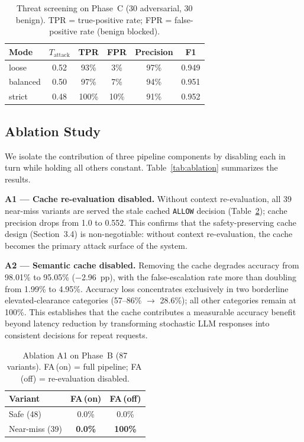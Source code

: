 \documentclass[runningheads]{llncs}
\begin{document}
\begin{table}[t]
\caption{Threat screening on Phase~C (30 adversarial, 30 benign). TPR = true-positive rate; FPR = false-positive rate (benign blocked).}
\label{tab:threat}
\centering
\renewcommand{\arraystretch}{1}
\begin{tabular}{lccccc}
\toprule
Mode & $T_{\text{attack}}$ & TPR & FPR & Precision & F1 \\
\midrule
loose    & 0.52 & 93\%  & 3\%  & 97\% & 0.949 \\
balanced & 0.50 & 97\%  & 7\%  & 94\% & 0.951 \\
strict   & 0.48 & 100\% & 10\% & 91\% & 0.952 \\
\bottomrule
\end{tabular}
\end{table}

\subsection{Ablation Study}

We isolate the contribution of three pipeline components by disabling each in turn while holding all others constant. Table~\ref{tab:ablation} summarizes the results.

\noindent\textbf{A1 --- Cache re-evaluation disabled.} Without context re-evaluation, all 39 near-miss variants are served the stale cached \texttt{ALLOW} decision (Table~\ref{tab:a1}); cache precision drops from 1.0 to 0.552. This confirms that the safety-preserving cache design (Section~3.4) is non-negotiable: without context re-evaluation, the cache becomes the primary attack surface of the system.

\noindent\textbf{A2 --- Semantic cache disabled.} Removing the cache degrades accuracy from 98.01\% to 95.05\% ($-$2.96~pp), with the false-escalation rate more than doubling from 1.99\% to 4.95\%. Accuracy loss concentrates exclusively in two borderline elevated-clearance categories (57–86\% $\to$ 28.6\%); all other categories remain at 100\%. This establishes that the cache contributes a measurable accuracy benefit beyond latency reduction by transforming stochastic LLM responses into consistent decisions for repeat requests.

\begin{table}[t]
\caption{Ablation A1 on Phase~B (87 variants). FA\,(on) = full pipeline; FA\,(off) = re-evaluation disabled.}
\label{tab:a1}
\centering
\renewcommand{\arraystretch}{1}
\begin{tabular}{@{}lcc@{}}
\toprule
Variant & FA\,(on) & FA\,(off) \\
\midrule
Safe (48)      & 0.0\%          & 0.0\%          \\
Near-miss (39) & \textbf{0.0\%} & \textbf{100\%} \\
\bottomrule
\end{tabular}
\end{table}
\end{document}

